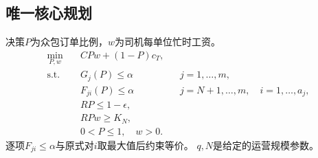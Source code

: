 \documentclass[UTF8,11pt]{ctexart}
\begin{document}
\subsection*{唯一核心规划}
决策$P$为众包订单比例，$w$为司机每单位忙时工资。
\begin{align}
\min_{P,w}\quad &CPw+(1-P)c_T,\tag{14a}\\
\text{s.t.}\quad&G_j(P)\le\alpha &&j=1,\ldots,m,\tag{14b}\\
&F_{ji}(P)\le\alpha &&j=N+1,\ldots,m,\quad i=1,\ldots,a_j,\tag{14c}\\
&RP\le1-\epsilon,\tag{14d}\\
&RPw\ge K_N,\tag{14e}\\
&0<P\le1,\quad w>0.\tag{14f}
\end{align}
逐项$F_{ji}\le\alpha$与原式对$i$取最大值后约束等价。
$q,N$是给定的运营规模参数。
\end{document}
